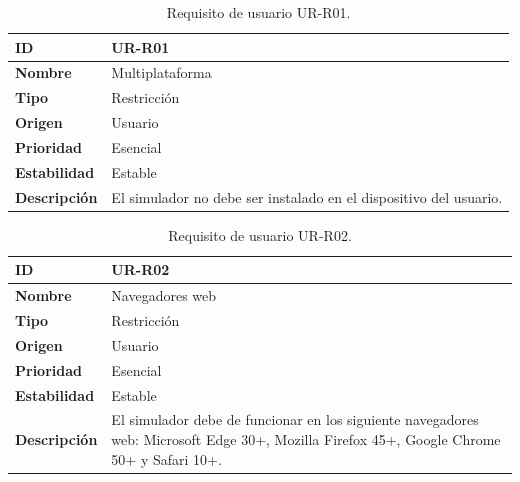 \begin{center}
\begin{table}[htbp]
\centering
\caption{Requisito de usuario UR-R01.}
\begin{tabular}{@{}p{2.5cm} p{9cm}@{}} 
\toprule
\textbf{ID} 				& UR-R01 \\
\midrule
\textbf{Nombre} 			& Multiplataforma\\
\midrule
\textbf{Tipo} 			& Restricción \\
\midrule
\textbf{Origen} 			& Usuario \\
\midrule
\textbf{Prioridad}		& Esencial \\
\midrule
\textbf{Estabilidad} 		& Estable \\
\midrule
\textbf{Descripción} 	& El simulador no debe ser instalado en el dispositivo del usuario. \\
\bottomrule
\end{tabular}
\label{tab:urr01}
\end{table}
\end{center}

\begin{center}
\begin{table}[htbp]
\centering
\caption{Requisito de usuario UR-R02.}
\begin{tabular}{@{}p{2.5cm} p{9cm}@{}} 
\toprule
\textbf{ID} 				& UR-R02 \\
\midrule
\textbf{Nombre} 			& Navegadores web \\
\midrule
\textbf{Tipo} 			& Restricción \\
\midrule
\textbf{Origen} 			& Usuario \\
\midrule
\textbf{Prioridad}		& Esencial \\
\midrule
\textbf{Estabilidad} 		& Estable \\
\midrule
\textbf{Descripción} 	& El simulador debe de funcionar en los siguiente navegadores web: Microsoft Edge 30+, Mozilla Firefox 45+, Google Chrome 50+ y Safari 10+. \\
\bottomrule
\end{tabular}
\label{tab:urr02}
\end{table}
\end{center}

